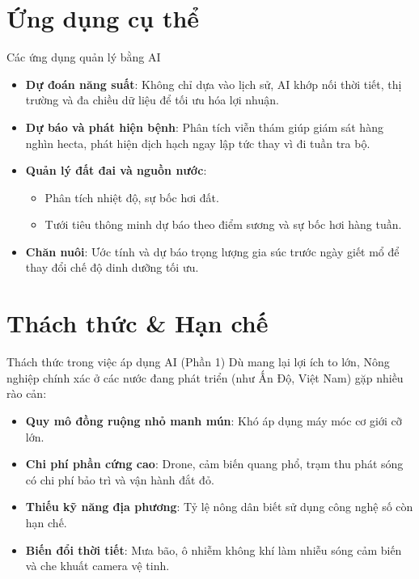 \documentclass[aspectratio=169]{beamer}
\begin{document}
\section{Ứng dụng cụ thể}
\begin{frame}{Các ứng dụng quản lý bằng AI}
    \begin{itemize}
        \item \textbf{Dự đoán năng suất}: Không chỉ dựa vào lịch sử, AI khớp nối thời tiết, thị trường và đa chiều dữ liệu để tối ưu hóa lợi nhuận.
        \item \textbf{Dự báo và phát hiện bệnh}: Phân tích viễn thám giúp giám sát hàng nghìn hecta, phát hiện dịch hạch ngay lập tức thay vì đi tuần tra bộ.
        \item \textbf{Quản lý đất đai và nguồn nước}:
        \begin{itemize}
            \item Phân tích nhiệt độ, sự bốc hơi đất.
            \item Tưới tiêu thông minh dự báo theo điểm sương và sự bốc hơi hàng tuần.
        \end{itemize}
        \item \textbf{Chăn nuôi}: Ước tính và dự báo trọng lượng gia súc trước ngày giết mổ để thay đổi chế độ dinh dưỡng tối ưu.
    \end{itemize}
\end{frame}

\section{Thách thức \& Hạn chế}
\begin{frame}{Thách thức trong việc áp dụng AI (Phần 1)}
    Dù mang lại lợi ích to lớn, Nông nghiệp chính xác ở các nước đang phát triển (như Ấn Độ, Việt Nam) gặp nhiều rào cản:
    \begin{itemize}
        \item \textbf{Quy mô đồng ruộng nhỏ manh mún}: Khó áp dụng máy móc cơ giới cỡ lớn.
        \item \textbf{Chi phí phần cứng cao}: Drone, cảm biến quang phổ, trạm thu phát sóng có chi phí bảo trì và vận hành đắt đỏ.
        \item \textbf{Thiếu kỹ năng địa phương}: Tỷ lệ nông dân biết sử dụng công nghệ số còn hạn chế.
        \item \textbf{Biến đổi thời tiết}: Mưa bão, ô nhiễm không khí làm nhiễu sóng cảm biến và che khuất camera vệ tinh.
    \end{itemize}
\end{frame}
\end{document}
